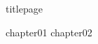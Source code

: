 \documentclass[
	,a4paper
	,12pt
	,oneside
]{book}
\begin{document}
\frontmatter
	{titlepage}
	\restoregeometry
	\tableofcontents

\mainmatter

	{chapter01}
	{chapter02}


\backmatter
\end{document}
